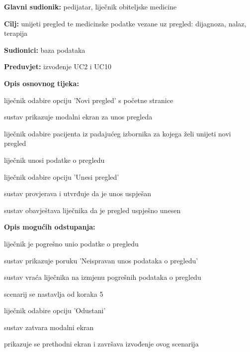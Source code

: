                     \noindent {}
					\begin{packed_item}
	
						\item \textbf{Glavni sudionik: }pedijatar, liječnik obiteljske medicine
						\item  \textbf{Cilj:} unijeti pregled te medicinske podatke vezane uz pregled: dijagnoza, nalaz, terapija
						\item  \textbf{Sudionici:} baza podataka
						\item  \textbf{Preduvjet:} izvođenje UC2 i UC10
						\item  \textbf{Opis osnovnog tijeka:}
						
						\item[] \begin{packed_enum}
	
							\item liječnik odabire opciju 'Novi pregled' s početne stranice
							\item sustav prikazuje modalni ekran za unos pregleda
							\item liječnik odabire pacijenta iz padajućeg izbornika za kojega želi unijeti novi pregled
							\item liječnik unosi podatke o pregledu
							\item liječnik odabire opciju 'Unesi pregled'
							\item sustav provjerava i utvrđuje da je unos uspješan
							\item sustav obavještava liječnika da je pregled uspješno unesen

						\end{packed_enum}

						\item  \textbf{Opis mogućih odstupanja:}
						
						\item[] \begin{packed_item}
	
							\item[6.a] liječnik je pogrešno unio podatke o pregledu
							\item[] \begin{packed_enum}
								
								\item sustav prikazuje poruku 'Neispravan unos podataka o pregledu'
								\item sustav vraća liječnika na izmjenu pogrešnih podataka o pregledu
								\item scenarij se nastavlja od koraka 5
							\end{packed_enum}
							\item [6.b] liječnik odabire opciju 'Odustani'
							\item [] \begin{packed_enum}
								\item sustav zatvara modalni ekran
								\item prikazuje se prethodni ekran i završava izvođenje ovog scenarija
							\end{packed_enum}
						\end{packed_item}
						

\end{packed_item}
